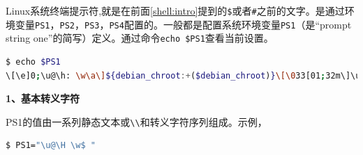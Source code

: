 \documentclass[doctor,openright,twoside]{sjtuthesis}
\newcommand{\passthrough}[1]{#1}
\theoremstyle{plain}
\theoremstyle{definition}
\theoremstyle{remark}
\theoremstyle{ocrenumbox}
\theoremstyle{plain}
\newcommand\cqh{“}
\newcommand\cqt{”}
\begin{document}
Linux系统终端提示符,就是在前面\ref{shell:intro}提到的\passthrough{\lstinline!$!}或者\passthrough{\lstinline!#!}之前的文字。是通过环境变量\passthrough{\lstinline!PS1!}，\passthrough{\lstinline!PS2!}，\passthrough{\lstinline!PS3!}，\passthrough{\lstinline!PS4!}配置的。一般都是配置系统环境变量\passthrough{\lstinline!PS1!}（是\cqh prompt
string
one\cqt 的简写）定义。通过命令\passthrough{\lstinline!echo $PS1!}查看当前设置。

\begin{lstlisting}[language=bash]
$ echo $PS1
\[\e]0;\u@\h: \w\a\]${debian_chroot:+($debian_chroot)}\[\033[01;32m\]\u@\h\[\033[00m\]:\[\033[01;34m\]\w\[\033[00m\]$\setminus\$$
\end{lstlisting}

\textbf{1、基本转义字符}

PS1的值由一系列静态文本或\passthrough{\lstinline!\\!}和转义字符序列组成。示例，

\begin{lstlisting}[language=bash]
$ PS1="\u@\H \w$ "
\end{lstlisting}
\end{document}

